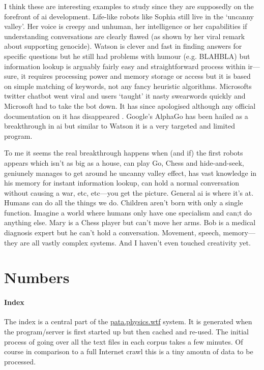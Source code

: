 I think these are interesting examples to study since they are supposedly on the forefront of \gls{ai} development. Life-like robots like Sophia still live in the `uncanny valley'. Her voice is creepy and unhuman, her intelligence or her capabilities if understanding conversations are clearly flawed (as shown by her viral remark about supporting genocide). Watson is clever and fast in finding answers for specific questions but he still had problems with humour (e.g. BLAHBLA) but information lookup is arguably fairly easy and straightforward process within \gls{ir}---sure, it requires processing power and memory storage or access but it is based on simple matching of keywords, not any fancy heuristic algorithms. Microsofts twitter chatbot went viral and users `taught' it nasty swearwords  quickly and Microsoft had to take the bot down. It has since apologised although any official documentation on it has disappeared . Google's AlphaGo has been hailed as a breakthrough in \gls{ai} but similar to Watson it is a very targeted and limited program. 

To me it seems the real breakthrough happens when (and if) the first robots appears which isn't as big as a house, can play Go, Chess and hide-and-seek, geniunely manages to get around he uncanny valley effect, has vast knowledge in his memory for instant information lookup, can hold a normal conversation without causing a war, etc, etc---you get the picture. General \gls{ai} is where it's at. Humans can do all the things we do. Children aren't born with only a single function. Imagine a world where humans only have one specialism and can;t do anything else. Mary is a Chess player but can't move her arms. Bob is a medical diagnosis expert but he can't hold a conversation. Movement, speech, memory---they are all vastly complex systems. And I haven't even touched creativity yet.


\section{Numbers}

\paragraph{Index}
The index is a central part of the \url{pata.physics.wtf} system. It is generated when the program/server is first started up but then cached and re-used. The initial process of going over all the text files in each corpus takes a few minutes. Of course in comparison to a full Internet crawl this is a tiny amoutn of data to be processed. 

